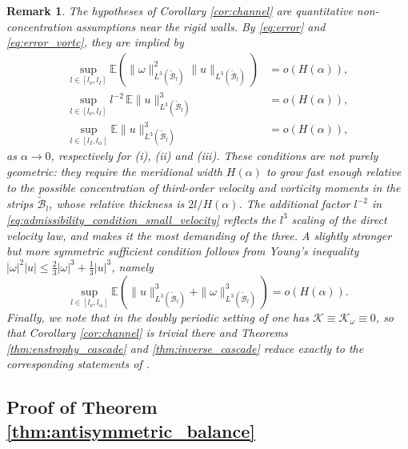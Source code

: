 \documentclass[11pt,a4paper]{article}
\numberwithin{equation}{section}
\newtheorem{remark}{Remark}%
\numberwithin{theorem}{section}
\numberwithin{remark}{section}
\numberwithin{definition}{section}
\begin{document}
\begin{remark}\label{rem:boundary_admissibility}
The hypotheses of Corollary \ref{cor:channel} are quantitative
non-concentration assumptions near the rigid walls. By \eqref{eq:error} and
\eqref{eq:error_vortc}, they are implied by
\begin{align}
    \sup_{l \in [l_\nu, l_I]}\mathbb{E}\left(\|\omega\|_{L^3(\widetilde{\mathcal{B}}_l)}^2 \|u\|_{L^3(\widetilde{\mathcal{B}}_l)}\right) &= o(H(\alpha)),\label{eq:admissibility_condition_small_vorticity}\\
    \sup_{l \in [l_\nu, l_I]} l^{-2}\,\mathbb{E}\|u\|_{L^3(\widetilde{\mathcal{B}}_l)}^3 &= o(H(\alpha)),\label{eq:admissibility_condition_small_velocity}\\
    \sup_{l \in [l_I, l_\alpha]}\mathbb{E}\|u\|_{L^3(\widetilde{\mathcal{B}}_l)}^3 &= o(H(\alpha)),\label{eq:admissibility_condition_large_velocity}
\end{align}
as $\alpha \to 0$, respectively for (i), (ii) and (iii). These conditions are
not purely geometric: they require the meridional width $H(\alpha)$ to grow
fast enough relative to the possible concentration of third-order velocity and
vorticity moments in the strips $\widetilde{\mathcal{B}}_l$, whose relative
thickness is $2l/H(\alpha)$. The additional factor $l^{-2}$ in
\eqref{eq:admissibility_condition_small_velocity} reflects the $l^3$ scaling of
the direct velocity law, and makes it the most demanding of the three.
A slightly stronger but more symmetric sufficient condition follows from Young's
inequality $|\omega|^2|u| \le \tfrac{2}{3}|\omega|^3 + \tfrac{1}{3}|u|^3$,
namely
\begin{equation}\label{eq:admissibility_condition_symmetric}
    \sup_{l \in [l_\nu, l_\alpha]}\mathbb{E}\left( \|u\|_{L^3(\widetilde{\mathcal{B}}_l)}^3 + \|\omega\|_{L^3(\widetilde{\mathcal{B}}_l)}^3 \right) = o(H(\alpha)).
\end{equation}
Finally, we note that in the doubly periodic setting of \cite{bed2D} one has
$\mathcal{K} \equiv \mathcal{K}_\omega \equiv 0$, so that Corollary
\ref{cor:channel} is trivial there and Theorems \ref{thm:enstrophy_cascade} and
\ref{thm:inverse_cascade} reduce exactly to the corresponding statements of
\cite{bed2D}.
\end{remark}




\subsection{Proof of Theorem \ref{thm:antisymmetric_balance}}\label{sec:zonal_dynamics}
\end{document}
